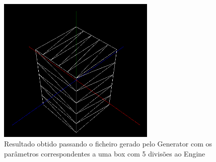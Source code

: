 \documentclass{article}
\begin{document}
\begin{figure}[H]
\centering
\includegraphics[height=7cm]{box.png}
\caption{Resultado obtido passando o ficheiro gerado pelo Generator com os parâmetros correspondentes a uma box com 5 divisões ao Engine}
\end{figure}
\end{document}
